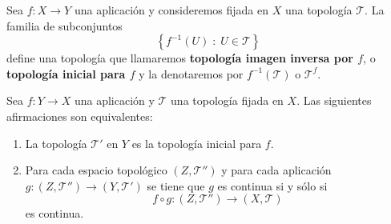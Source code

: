 \begin{definition}
Sea $\displaystyle f : X \to Y $ una aplicación y consideremos fijada en $\displaystyle X $ una topología $\displaystyle \mathcal{T} $. La familia de subconjuntos
\[ \left\{ f^{-1}\left(U\right) \; : \; U \in \mathcal{T}\right\}  \]
define una topología que llamaremos \textbf{topología imagen inversa por $\displaystyle f $}, o \textbf{topología inicial para $\displaystyle f $} y la denotaremos por $\displaystyle f^{-1}\left(\mathcal{T}\right) $ o $\displaystyle \mathcal{T}^{f} $. 
\end{definition}
\begin{prop}
Sea $\displaystyle f : Y \to X $ una aplicación y $\displaystyle \mathcal{T} $ una topología fijada en $\displaystyle X $. Las siguientes afirmaciones son equivalentes:
\begin{enumerate}
\item La topología $\displaystyle \mathcal{T}' $ en $\displaystyle Y $ es la topología inicial para $\displaystyle f $. 
\item Para cada espacio topológico $\displaystyle \left(Z, \mathcal{T}''\right) $ y para cada aplicación $\displaystyle g : \left(Z, \mathcal{T}''\right)\to \left(Y, \mathcal{T}'\right) $ se tiene que $\displaystyle g $ es continua si y sólo si 
	\[f\circ g : \left(Z, \mathcal{T}''\right)\to \left(X, \mathcal{T}\right) \]
	es continua.
\end{enumerate}
\end{prop}
